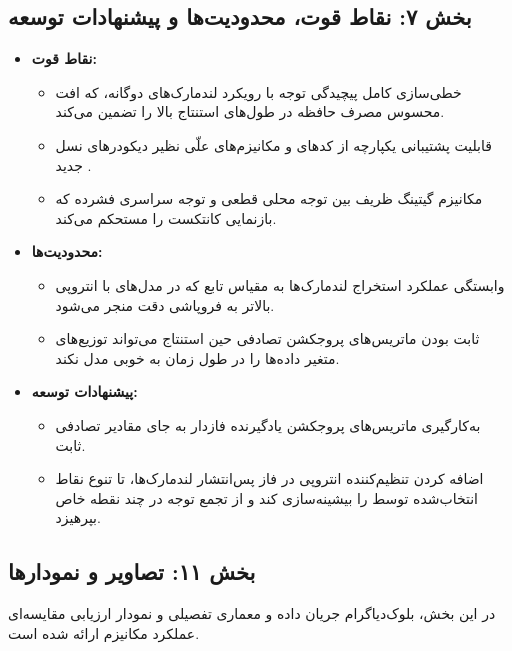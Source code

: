 \subsection*{بخش ۷: نقاط قوت، محدودیت‌ها و پیشنهادات توسعه }
\begin{itemize}
    \item \textbf{نقاط قوت:}
    \begin{itemize}
        \item خطی‌سازی کامل پیچیدگی توجه با رویکرد لندمارک‌های دوگانه، که افت محسوس مصرف حافظه در طول‌های استنتاج بالا را تضمین می‌کند.
        \item قابلیت پشتیبانی یکپارچه از کدهای  و مکانیزم‌های علّی نظیر دیکودرهای نسل جدید .
        \item مکانیزم گیتینگ ظریف بین توجه محلی قطعی و توجه سراسری فشرده که بازنمایی کانتکست را مستحکم می‌کند.
    \end{itemize}
    \item \textbf{محدودیت‌ها:}
    \begin{itemize}
        \item وابستگی عملکرد استخراج لندمارک‌ها به مقیاس  تابع  که در مدل‌های با انتروپی بالاتر  به فروپاشی دقت منجر می‌شود.
        \item ثابت بودن ماتریس‌های پروجکشن تصادفی حین استنتاج می‌تواند توزیع‌های متغیر داده‌ها را در طول زمان به خوبی مدل نکند.
    \end{itemize}
    \item \textbf{پیشنهادات توسعه:}
    \begin{itemize}
        \item به‌کارگیری ماتریس‌های پروجکشن یادگیرنده فازدار  به جای مقادیر تصادفی ثابت.
        \item اضافه کردن تنظیم‌کننده انتروپی در فاز پس‌انتشار لندمارک‌ها، تا تنوع نقاط انتخاب‌شده توسط  را بیشینه‌سازی کند و از تجمع توجه در چند نقطه خاص بپرهیزد.
    \end{itemize}
\end{itemize}

\subsection*{بخش ۱۱: تصاویر و نمودارها }
در این بخش، بلوک‌دیاگرام جریان داده و معماری تفصیلی و نمودار ارزیابی مقایسه‌ای عملکرد مکانیزم  ارائه شده است.

